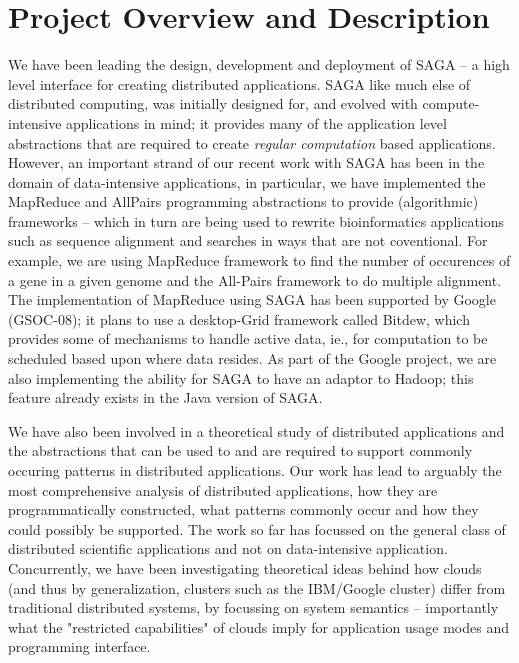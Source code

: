 \documentclass[10pt,letterpaper]{article}
\begin{document}



\setcounter{page}{1}
\pagestyle{plain} 
\normalsize


\section{Project Overview and Description}

We have been leading the design, development and deployment of SAGA -- a high level
interface for creating distributed applications.  SAGA like much else of distributed computing, was initially designed for, and evolved with  compute-intensive applications in mind; it provides many of the application level abstractions that are required to create {\it regular computation} based applications.
However, an important  strand of our recent work with SAGA has been in the domain of
data-intensive applications, in particular, we have implemented the
MapReduce and AllPairs  programming abstractions to provide 
(algorithmic) frameworks -- which in turn are being used to rewrite  bioinformatics applications
such as sequence alignment and searches in ways that are not coventional.
For example, we are using MapReduce framework to find the number of occurences of a gene in 
a given genome and the All-Pairs framework to do multiple alignment.
The implementation of MapReduce using SAGA has been supported by Google (GSOC-08); it plans
to use a desktop-Grid framework called Bitdew, which provides some of mechanisms to
handle active data, ie., for computation to be scheduled based upon where
data resides. As part of the Google project, we are also implementing the ability for SAGA to have an adaptor to Hadoop; this feature already exists in the Java version of SAGA.

We have also been involved in a theoretical study of distributed applications and the abstractions that can be used to and are required to support commonly occuring patterns in distributed applications.
Our work has lead to arguably the most comprehensive analysis of distributed applications, how they are programmatically constructed, what patterns commonly occur and how they could possibly
be supported. The  work so far has focussed on the general class of distributed
scientific applications and not on data-intensive application.
Concurrently, we have been investigating theoretical ideas behind  how clouds (and thus
by generalization, clusters such as the IBM/Google cluster) differ
from traditional distributed systems, by focussing on system semantics --  importantly what the "restricted capabilities" of clouds imply for application usage modes and programming interface. 
\end{document}
